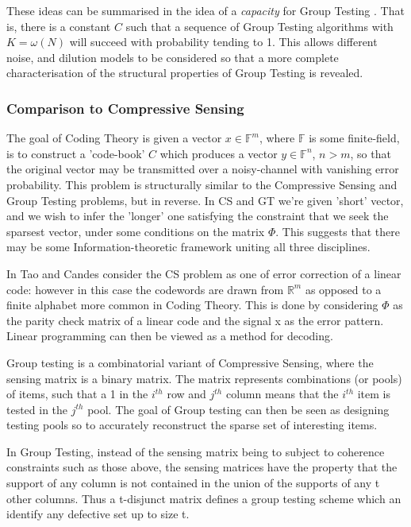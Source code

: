 These ideas can be summarised in the idea of a \textit{capacity} for Group Testing \cite{Baldassini2013}. That is, there is a constant \(C\) such that a sequence of Group Testing algorithms with \( K = \omega\left(N\right)\) will succeed with probability tending to 1. This allows different noise, and dilution models to be considered so that a more complete characterisation of the structural properties of Group Testing is revealed.
 
\subsubsection{Comparison to Compressive Sensing}
The goal of Coding Theory is given a vector \(x \in \mathbb{F}^m\), where \(\mathbb{F}\) is some finite-field, is to construct a 'code-book' \(C\) which produces a vector \(y \in \mathbb{F}^n\), \(n > m\), so that the original vector may be transmitted over a noisy-channel with vanishing error probability. This problem is structurally similar to the Compressive Sensing and Group Testing problems, but in reverse. In CS and GT we're given 'short' vector, and we wish to infer the 'longer' one satisfying the constraint that we seek the sparsest vector, under some conditions on the matrix \(\Phi\). This suggests that there may be some Information-theoretic framework uniting all three disciplines. 

In \cite{Emma} Tao and Candes consider the CS problem as one of error correction of a linear code: however in this case the codewords are drawn from \(\mathbb{R}^m\) as opposed to a finite alphabet more common in Coding Theory. This is done by considering \(\Phi\) as the parity check matrix of a linear code and the signal x as the error pattern. Linear programming can then be viewed as a method for decoding. 

Group testing is a combinatorial variant of Compressive Sensing, where the sensing matrix is a binary matrix. The matrix represents combinations (or pools) of items, such that a 1 in the \(i^{th}\) row and \(j^{th}\) column means that  the \(i^{th}\) item is tested in the \(j^{th}\) pool. The goal of Group testing can then be seen as designing testing pools so to accurately reconstruct the sparse set of interesting items. 

In Group Testing, instead of the sensing matrix being to subject to coherence constraints such as those above, the sensing matrices have the property that the support of any column is not contained in the union of the supports of any t other columns. Thus a t-disjunct matrix defines a group testing scheme which an identify any defective set up to size t.

